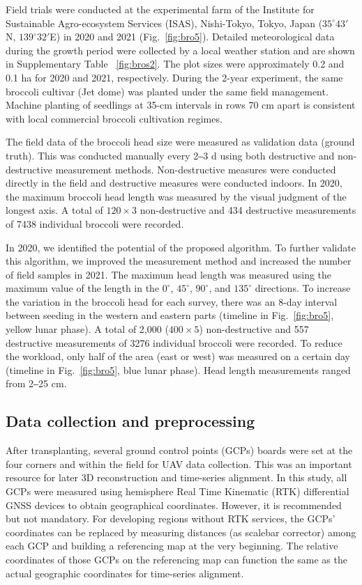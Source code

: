 Field trials were conducted at the experimental farm of the Institute for Sustainable Agro-ecosystem Services (ISAS), Nishi-Tokyo, Tokyo, Japan ($35^\circ 43'$N, $139^\circ 32'$E) in 2020 and 2021 (Fig.~\ref{fig:bro5}). Detailed meteorological data during the growth period were collected by a local weather station and are shown in Supplementary Table ~\ref{fig:bros2}. The plot sizes were approximately 0.2 and 0.1 ha for 2020 and 2021, respectively. During the 2-year experiment, the same broccoli cultivar (Jet dome) was planted under the same field management. Machine planting of seedlings at 35-cm intervals in rows 70 cm apart is consistent with local commercial broccoli cultivation regimes. 



The field data of the broccoli head size were measured as validation data (ground truth). This was conducted manually every 2‒3 d using both destructive and non-destructive measurement methods. Non-destructive measures were conducted directly in the field and destructive measures were conducted indoors. In 2020, the maximum broccoli head length was measured by the visual judgment of the longest axis. A total of $120 \times 3$ non-destructive and 434 destructive measurements of 7438 individual broccoli were recorded. 

In 2020, we identified the potential of the proposed algorithm. To further validate this algorithm, we improved the measurement method and increased the number of field samples in 2021. The maximum head length was measured using the maximum value of the length in the $0^\circ$, $45^\circ$, $90^\circ$, and $135^\circ$ directions. To increase the variation in the broccoli head for each survey, there was an 8-day interval between seeding in the western and eastern parts (timeline in Fig.~\ref{fig:bro5}, yellow lunar phase). A total of 2,000 ($400 \times 5$) non-destructive and 557 destructive measurements of 3276 individual broccoli were recorded. To reduce the workload, only half of the area (east or west) was measured on a certain day (timeline in Fig.~\ref{fig:bro5}, blue lunar phase). Head length measurements ranged from 2‒25 cm.

\subsection{Data collection and preprocessing}

After transplanting, several ground control points (GCPs) boards were set at the four corners and within the field for UAV data collection. This was an important resource for later 3D reconstruction and time-series alignment. In this study, all GCPs were measured using hemisphere Real Time Kinematic (RTK) differential GNSS devices to obtain geographical coordinates. However, it is recommended but not mandatory. For developing regions without RTK services, the GCPs' coordinates can be replaced by measuring distances (as scalebar corrector) among each GCP and building a referencing map at the very beginning. The relative coordinates of those GCPs on the referencing map can function the same as the actual geographic coordinates for time-series alignment.

